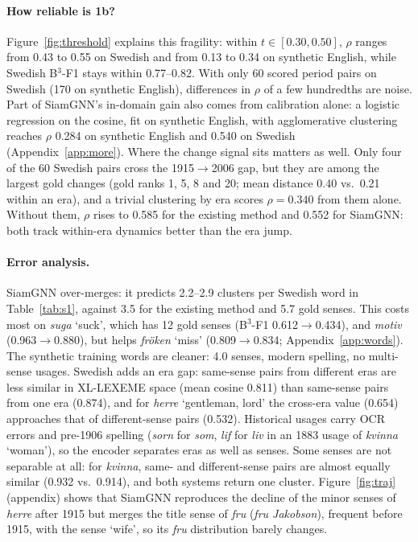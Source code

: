 \documentclass[11pt]{article}
\newcommand{\sys}{SiamGNN\xspace}
\newcommand{\xll}{XL-LEXEME\xspace}
\newcommand{\bcubed}{B$^3$-F1\xspace}
\begin{document}
\paragraph{How reliable is 1b?}
Figure~\ref{fig:threshold} explains this fragility: within $t\in[0.30,0.50]$, $\rho$ ranges from 0.43 to 0.55 on Swedish and from 0.13 to 0.34 on synthetic English, while Swedish \bcubed stays within 0.77--0.82. With only 60 scored period pairs on Swedish (170 on synthetic English), differences in $\rho$ of a few hundredths are noise. Part of \sys's in-domain gain also comes from calibration alone: a logistic regression on the cosine, fit on synthetic English, with agglomerative clustering reaches $\rho$ 0.284 on synthetic English and 0.540 on Swedish (Appendix~\ref{app:more}). Where the change signal sits matters as well. Only four of the 60 Swedish pairs cross the 1915$\rightarrow$2006 gap, but they are among the largest gold changes (gold ranks 1, 5, 8 and 20; mean distance 0.40 vs.\ 0.21 within an era), and a trivial clustering by era scores $\rho=0.340$ from them alone. Without them, $\rho$ rises to 0.585 for the existing method and 0.552 for \sys: both track within-era dynamics better than the era jump.

\paragraph{Error analysis.}
\sys over-merges: it predicts 2.2--2.9 clusters per Swedish word in Table~\ref{tab:s1}, against 3.5 for the existing method and 5.7 gold senses. This costs most on \emph{suga} `suck', which has 12 gold senses (\bcubed 0.612$\rightarrow$0.434), and \emph{motiv} (0.963$\rightarrow$0.880), but helps \emph{fröken} `miss' (0.809$\rightarrow$0.834; Appendix~\ref{app:words}). The synthetic training words are cleaner: 4.0 senses, modern spelling, no multi-sense usages. Swedish adds an era gap: same-sense pairs from different eras are less similar in \xll space (mean cosine 0.811) than same-sense pairs from one era (0.874), and for \emph{herre} `gentleman, lord' the cross-era value (0.654) approaches that of different-sense pairs (0.532). Historical usages carry OCR errors and pre-1906 spelling (\emph{sorn} for \emph{som}, \emph{lif} for \emph{liv} in an 1883 usage of \emph{kvinna} `woman'), so the encoder separates eras as well as senses. Some senses are not separable at all: for \emph{kvinna}, same- and different-sense pairs are almost equally similar (0.932 vs.\ 0.914), and both systems return one cluster. Figure~\ref{fig:traj} (appendix) shows that \sys reproduces the decline of the minor senses of \emph{herre} after 1915 but merges the title sense of \emph{fru} (\emph{fru Jakobson}), frequent before 1915, with the sense `wife', so its \emph{fru} distribution barely changes.
\end{document}
